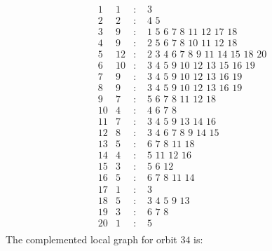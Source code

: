 \documentclass[12pt]{article}
\begin{document}
\begin{equation*}
\begin{array}{rrcl}
1&1&:&\,\,3\\
2&2&:&\,\,4\,\,5\\
3&9&:&\,\,1\,\,5\,\,6\,\,7\,\,8\,\,11\,\,12\,\,17\,\,18\\
4&9&:&\,\,2\,\,5\,\,6\,\,7\,\,8\,\,10\,\,11\,\,12\,\,18\\
5&12&:&\,\,2\,\,3\,\,4\,\,6\,\,7\,\,8\,\,9\,\,11\,\,14\,\,15\,\,18\,\,20\\
6&10&:&\,\,3\,\,4\,\,5\,\,9\,\,10\,\,12\,\,13\,\,15\,\,16\,\,19\\
7&9&:&\,\,3\,\,4\,\,5\,\,9\,\,10\,\,12\,\,13\,\,16\,\,19\\
8&9&:&\,\,3\,\,4\,\,5\,\,9\,\,10\,\,12\,\,13\,\,16\,\,19\\
9&7&:&\,\,5\,\,6\,\,7\,\,8\,\,11\,\,12\,\,18\\
10&4&:&\,\,4\,\,6\,\,7\,\,8\\
11&7&:&\,\,3\,\,4\,\,5\,\,9\,\,13\,\,14\,\,16\\
12&8&:&\,\,3\,\,4\,\,6\,\,7\,\,8\,\,9\,\,14\,\,15\\
13&5&:&\,\,6\,\,7\,\,8\,\,11\,\,18\\
14&4&:&\,\,5\,\,11\,\,12\,\,16\\
15&3&:&\,\,5\,\,6\,\,12\\
16&5&:&\,\,6\,\,7\,\,8\,\,11\,\,14\\
17&1&:&\,\,3\\
18&5&:&\,\,3\,\,4\,\,5\,\,9\,\,13\\
19&3&:&\,\,6\,\,7\,\,8\\
20&1&:&\,\,5\\
\end{array}
\end{equation*}
The complemented local graph for orbit $34$ is:
\end{document}
